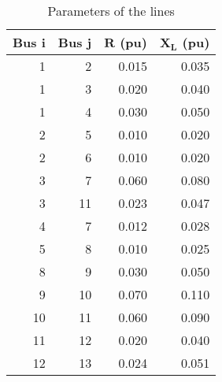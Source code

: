 \begin{table}[!htb]\centering
    \caption{Parameters of the lines}
    \begin{tabular}{rrrr}
        \hline
         \textbf{Bus} $\mathbf{i}$ & \textbf{Bus} $\mathbf{j}$ & $\mathbf{R}$ \textbf{(pu)} & $\mathbf{X_L}$ \textbf{(pu)} \\
         \hline
    1     & 2     & 0.015 & 0.035 \\
    1     & 3     & 0.020 & 0.040 \\
    1     & 4     & 0.030 & 0.050 \\
    2     & 5     & 0.010 & 0.020 \\
    2     & 6     & 0.010 & 0.020 \\
    3     & 7     & 0.060 & 0.080 \\
    3     & 11    & 0.023 & 0.047 \\
    4     & 7     & 0.012 & 0.028 \\
    5     & 8     & 0.010 & 0.025 \\
    8     & 9     & 0.030 & 0.050 \\
    9     & 10     & 0.070 & 0.110 \\
    10     & 11    & 0.060 & 0.090 \\
    11    & 12    & 0.020 & 0.040 \\
    12    & 13    & 0.024 & 0.051 \\
        \hline
    \end{tabular}
    \label{tab:Sdata_l}
\end{table}

